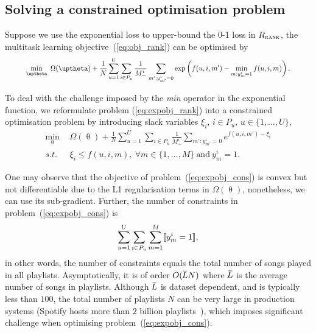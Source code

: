 \subsection{Solving a constrained optimisation problem}

Suppose we use the exponential loss to upper-bound the 0-1 loss in $R_\textsc{rank}$,
the multitask learning objective~(\ref{eq:obj_rank}) can be optimised by
\begin{equation}
\label{eq:expobj_rank}
\resizebox{.9\linewidth}{!}{$\displaystyle
\min_{\uptheta} \ \Omega(\uptheta) + \frac{1}{N} \sum_{u=1}^U \sum_{i \in P_u} \frac{1}{M_-^i} 
                  \sum_{m': y_{m'}^i = 0} \exp \left(f(u, i, m') - \min_{m: y_m^i = 1} f(u, i, m) \right).
$}
\end{equation}

To deal with the challenge imposed by the \emph{min} operator in the exponential function, 
we reformulate problem (\ref{eq:expobj_rank}) into a constrained optimisation problem by 
introducing slack variables $\xi_i, \, i \in P_u, \, u \in \{1,\dots,U\}$,
\begin{equation}
\label{eq:expobj_cons}
\begin{aligned}
\min_{\uptheta} \ \, & \Omega(\uptheta) + \frac{1}{N} \sum_{u=1}^U \sum_{i \in P_u} \frac{1}{M_-^i} \sum_{m': y_{m'}^i = 0} e^{f(u, i, m') - \xi_i} \\
s.t. \ \, & \xi_i \le f(u, i, m), \ \forall m \in \{1,\dots,M\} \ \text{and} \ y_m^i = 1.
\end{aligned}
\end{equation}

One may observe that the objective of problem~(\ref{eq:expobj_cons}) is convex but not differentiable due to 
the L1 regularisation terms in $\Omega(\uptheta)$, nonetheless, we can use its sub-gradient.
Further, the number of constraints in problem~(\ref{eq:expobj_cons}) is
$$
\sum_{u=1}^U \sum_{i \in P_u} \sum_{m=1}^M \llbracket y_m^i = 1 \rrbracket,
$$
in other words, the number of constraints equals the total number of songs played in all playlists.
Asymptotically, it is of order $O(\widebar{L} N)$ where $\widebar{L}$ is the average number of songs in playlists.
Although $\widebar{L}$ is dataset dependent, and is typically less than $100$,
the total number of playlists $N$ can be very large in production systems 
(\eg Spotify hosts more than $2$ billion playlists~\cite{recsysch2018}),
which imposes significant challenge when optimising problem~(\ref{eq:expobj_cons}).

